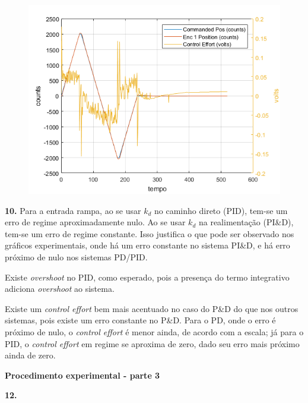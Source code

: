 \documentclass[a4paper,11pt]{article}
\begin{document}
\begin{figure}[H]
\includegraphics{q09-pid}
\centering
\end{figure}

\textbf{10.}
Para a entrada rampa, ao se usar $k_d$ no caminho direto (PID), tem-se um erro de
regime aproximadamente nulo. Ao se usar $k_d$ na realimentação (PI\&D), tem-se um
erro de regime constante. Isso justifica o que pode ser observado nos gráficos
experimentais, onde há um erro constante no sistema PI\&D, e há erro próximo de
nulo nos sistemas PD/PID.

Existe \textit{overshoot} no PID, como esperado, pois a presença do termo
integrativo adiciona \textit{overshoot} ao sistema.

Existe um \textit{control effort} bem mais acentuado no caso do P\&D do que nos
outros sistemas, pois existe um erro constante no P\&D.
Para o PD, onde o erro é próximo de nulo, o \textit{control effort} é menor
ainda, de acordo com a escala; já para o PID, o \textit{control effort} em
regime se aproxima de zero, dado seu erro mais próximo ainda de zero.


\pagebreak

\textbf{Procedimento experimental - parte 3}

\textbf{12.}
\end{document}
